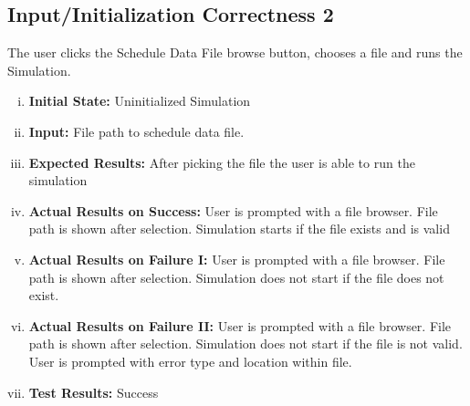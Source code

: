 \documentclass[paper=letter, fontsize=10pt]{scrartcl}
\numberwithin{equation}{section}		%
\numberwithin{figure}{section}			%
\numberwithin{table}{section}				%
\begin{document}
\subsection{Input/Initialization Correctness 2}
The user clicks the Schedule Data File browse button, chooses a file and runs the Simulation.
\begin{enumerate}[(i)]
	\item \textbf{Initial State:} Uninitialized Simulation   
	\item \textbf{Input:} File path to schedule data file.
	\item \textbf{Expected Results:} After picking the file the user is able to run the simulation
	\item \textbf{Actual Results on Success:} User is prompted with a file browser. File path is shown after selection. Simulation starts if the file exists and is valid
	\item \textbf{Actual Results on Failure I:} User is prompted with a file browser. File path is shown after selection. Simulation does not start if the file does not exist.
	\item \textbf{Actual Results on Failure II:} User is prompted with a file browser. File path is shown after selection. Simulation does not start if the file is not valid. User is prompted with error type and location within file.
		\item \textbf{Test Results:} Success
\end{enumerate}
\end{document}
